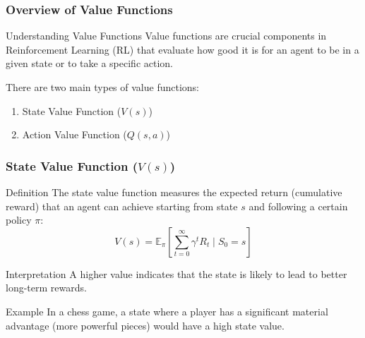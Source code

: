\documentclass[aspectratio=169]{beamer}
\begin{document}
\begin{frame}[fragile]
  \frametitle{Overview of Value Functions}
  
  \begin{block}{Understanding Value Functions}
    Value functions are crucial components in Reinforcement Learning (RL) that evaluate how good it is for an agent to be in a given state or to take a specific action.
  \end{block}
  
  There are two main types of value functions:
  \begin{enumerate}
    \item State Value Function ($V(s)$)
    \item Action Value Function ($Q(s, a)$)
  \end{enumerate}
\end{frame}

\begin{frame}[fragile]
  \frametitle{State Value Function ($V(s)$)}

  \begin{block}{Definition}
    The state value function measures the expected return (cumulative reward) that an agent can achieve starting from state $s$ and following a certain policy $\pi$:
    \begin{equation}
      V(s) = \mathbb{E}_{\pi}\left[\sum_{t=0}^{\infty} \gamma^t R_t \mid S_0 = s\right]
    \end{equation}
  \end{block}

  \begin{block}{Interpretation}
    A higher value indicates that the state is likely to lead to better long-term rewards.
  \end{block}

  \begin{block}{Example}
    In a chess game, a state where a player has a significant material advantage (more powerful pieces) would have a high state value.
  \end{block}
\end{frame}
\end{document}
